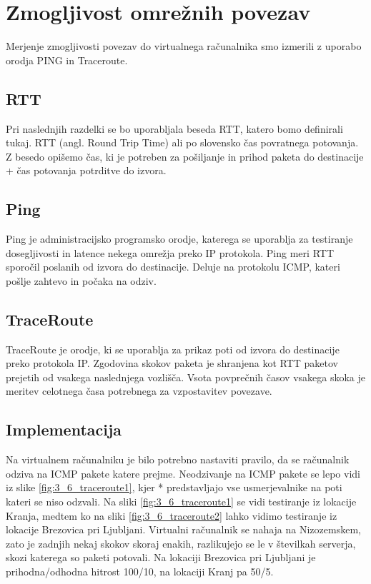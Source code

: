 \section{Zmogljivost omrežnih povezav}

Merjenje zmogljivosti povezav do virtualnega računalnika smo izmerili z uporabo orodja PING in Traceroute.

\subsection{RTT}
Pri naslednjih razdelki se bo uporabljala beseda RTT, katero bomo definirali tukaj. RTT (angl. Round Trip Time) ali po slovensko čas povratnega potovanja. Z besedo opišemo čas, ki je potreben za pošiljanje in prihod paketa do destinacije + čas potovanja potrditve do izvora.

\subsection{Ping}
Ping je administracijsko programsko orodje, katerega se uporablja za testiranje dosegljivosti in latence nekega omrežja preko IP protokola. Ping meri RTT sporočil poslanih od izvora do destinacije. Deluje na protokolu ICMP, kateri pošlje zahtevo in počaka na odziv.

\subsection{TraceRoute}
TraceRoute je orodje, ki se uporablja za prikaz poti od izvora do destinacije preko protokola IP. Zgodovina skokov paketa je shranjena kot RTT paketov prejetih od vsakega naslednjega vozlišča. Vsota povprečnih časov vsakega skoka je meritev celotnega časa potrebnega za vzpostavitev povezave.

\subsection{Implementacija}
Na virtualnem računalniku je bilo potrebno nastaviti pravilo, da se računalnik odziva na ICMP pakete katere prejme. Neodzivanje na ICMP pakete se lepo vidi iz slike \ref{fig:3_6_traceroute1}, kjer * predstavljajo vse usmerjevalnike na poti kateri se niso odzvali. Na sliki \ref{fig:3_6_traceroute1} se vidi testiranje iz lokacije Kranja, medtem ko na sliki \ref{fig:3_6_traceroute2} lahko vidimo testiranje iz lokacije Brezovica pri Ljubljani. Virtualni računalnik se nahaja na Nizozemskem, zato je zadnjih nekaj skokov skoraj enakih, razlikujejo se le v številkah serverja, skozi katerega so paketi potovali. Na lokaciji Brezovica pri Ljubljani je prihodna/odhodna hitrost 100/10, na 
lokaciji Kranj pa 50/5. 

